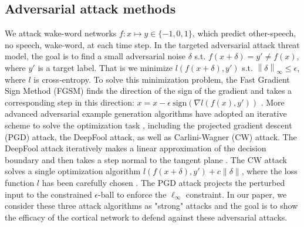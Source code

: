 \documentclass{article}
\newcommand{\norm}[1]{\left\lVert#1\right\rVert}
\begin{document}
\subsection{Adversarial attack methods}
We attack wake-word networks $f: x \mapsto y\in \{-1,0,1\}$, which predict other-speech, no speech, wake-word, at each time step. 
In the targeted adversarial attack threat model, the goal is to find a small adversarial noise $\delta$ s.t. $f(x+\delta)=y'\neq f(x)$, where $y'$ is a target label.
That is we minimize $l(f(x+\delta), y')$ s.t. $\norm{\delta}_\infty \leq \epsilon$, where $l$ is cross-entropy.
To solve this minimization problem, the Fast Gradient Sign Method (FGSM) finds the direction of the sign of the gradient and takes a corresponding step in this direction:
$x = x - \epsilon \ \mathrm{sign}(\nabla l(f(x),y'))$
\cite{fgsm}.
More advanced adversarial example generation algorithms have adopted an iterative scheme to solve the optimization task \cite{pgd,deepfool,cw,univadv}, including the projected gradient descent (PGD) attack, the DeepFool attack, as well as Carlini-Wagner (CW) attack. The DeepFool attack iteratively makes a linear approximation of the decision boundary and then takes a step normal to the tangent plane \cite{deepfool}. The CW attack solves a single optimization algorithm $l(f(x+\delta), y')+c\|\delta\|$, where the loss function $l$ has been carefully chosen \cite{cw}. The PGD attack projects the perturbed input to the constrained $\epsilon$-ball to enforce the $\ell_\infty$ constraint. In our paper, we consider these three attack algorithms as "strong" attacks and the goal is to show the efficacy of the cortical network to defend against these adversarial attacks.
\end{document}
